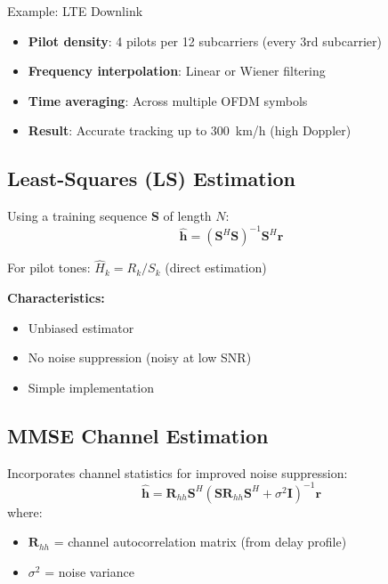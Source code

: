 \begin{calloutbox}{Example: LTE Downlink}
\begin{itemize}
\item \textbf{Pilot density}: 4 pilots per 12 subcarriers (every 3rd subcarrier)
\item \textbf{Frequency interpolation}: Linear or Wiener filtering
\item \textbf{Time averaging}: Across multiple OFDM symbols
\item \textbf{Result}: Accurate tracking up to 300~km/h (high Doppler)
\end{itemize}
\end{calloutbox}

\subsection{Least-Squares (LS) Estimation}

Using a training sequence $\mathbf{S}$ of length $N$:
\begin{equation}
\hat{\mathbf{h}} = (\mathbf{S}^H \mathbf{S})^{-1} \mathbf{S}^H \mathbf{r}
\label{eq:ls-estimation}
\end{equation}

For pilot tones: $\hat{H}_k = R_k / S_k$ (direct estimation)

\textbf{Characteristics:}
\begin{itemize}
\item Unbiased estimator
\item No noise suppression (noisy at low SNR)
\item Simple implementation
\end{itemize}

\subsection{MMSE Channel Estimation}

Incorporates channel statistics for improved noise suppression:
\begin{equation}
\hat{\mathbf{h}} = \mathbf{R}_{hh} \mathbf{S}^H (\mathbf{S} \mathbf{R}_{hh} \mathbf{S}^H + \sigma^2 \mathbf{I})^{-1} \mathbf{r}
\label{eq:mmse-channel-est}
\end{equation}
where:
\begin{itemize}
\item $\mathbf{R}_{hh}$ = channel autocorrelation matrix (from delay profile)
\item $\sigma^2$ = noise variance
\end{itemize}

